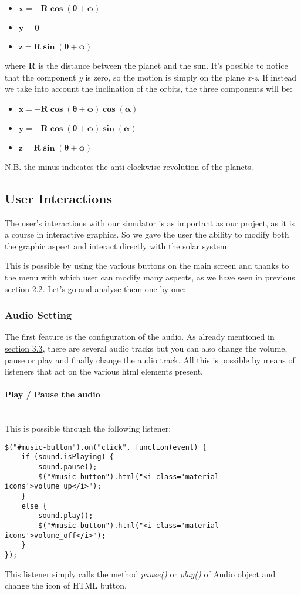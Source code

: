 \documentclass{article}
\begin{document}
\begin{itemize}
	\item $\mathbf{x = -R\cos(\theta + \phi)}$
	\item $\mathbf{y = 0}$
	\item $\mathbf{z = R\sin(\theta + \phi)}$
\end{itemize}
where \textbf{R} is the distance between the planet and the sun. \newline
It's possible to notice that the component \textit{y} is zero, so the motion is simply on the plane \textit{x-z}.
If instead we take into account the inclination of the orbits, the three components will be:
\begin{itemize}
	\item $\mathbf{x = -R\cos(\theta + \phi)\cos(\alpha)}$
	\item $\mathbf{y = -R\cos(\theta + \phi)\sin(\alpha)}$
	\item $\mathbf{z = R\sin(\theta + \phi)}$
\end{itemize}
N.B. the minus indicates the anti-clockwise revolution of the planets.

\subsection{User Interactions}
The user's interactions with our simulator is as important as our project, as it is a course in interactive graphics. So we gave the user the ability to modify both the graphic aspect and interact directly with the solar system.
\par This is possible by using the various buttons on the main screen and thanks to the menu with which user can modify many aspects, as we have seen in previous \hyperref[menuoptions:section]{section 2.2}. Let's go and analyse them one by one:

\subsubsection{Audio Setting}
The first feature is the configuration of the audio. As already mentioned in \hyperref[music:section]{section 3.3}, there are several audio tracks but you can also change the volume, pause or play and finally change the audio track. All this is possible by means of listeners that act on the various html elements present.
\paragraph{Play / Pause the audio} \mbox{}\\
This is possible through the following listener:
\begin{lstlisting}
$("#music-button").on("click", function(event) {
	if (sound.isPlaying) {
		sound.pause();
		$("#music-button").html("<i class='material-icons'>volume_up</i>");
	}
	else {
		sound.play();
		$("#music-button").html("<i class='material-icons'>volume_off</i>");
	}
});
\end{lstlisting}
This listener simply calls the method \textit{pause()} or \textit{play()} of Audio object and change the icon of HTML button.
\end{document}
